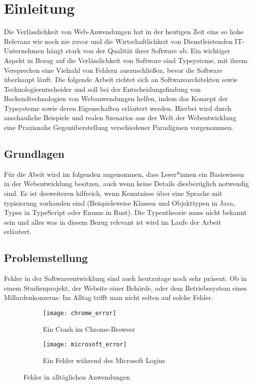\section{Einleitung} 

Die Verlässlichkeit von Web-Anwendungen hat in der heutigen Zeit eine so hohe Relevanz wie noch
nie zuvor und die Wirtschaftlichkeit von Dienstleistenden IT-Unternehmen hängt stark von der Qualität ihrer Software ab.
Ein wichtiger Aspekt in Bezug auf die Verlässlichkeit von Software sind Typsysteme, mit ihrem Versprechen eine Vielzahl
von Fehlern auszuschließen, bevor die Software überhaupt läuft.
Die folgende Arbeit richtet sich an Softwarearchitekten sowie Technologieentscheider
und soll bei der Entscheidungsfindung von Backendtechnologien von Webanwendungen helfen, 
indem das Konzept der Typsysteme sowie deren Eigenschaften erläutert werden.
Hierbei wird durch anschauliche Beispiele und realen Szenarios aus der Welt der Webentwicklung eine Praxisnahe
Gegenüberstellung verschiedener Paradigmen vorgenommen.

\subsection{Grundlagen} 

Für die Abeit wird im folgenden angenommen, dass Leser*innen ein Basiswissen in der Webentwicklung besitzen,
auch wenn keine Details diesbezüglich notwendig sind.
Es ist desweiteren hilfreich, wenn Kenntnisse über eine Sprache mit typisierung vorhanden sind
(Beispielsweise Klassen und Objekttypen in Java, Types in TypeScript oder Enums in Rust).
Die Typentheorie muss nicht bekannt sein und alles was in diesem Bezug relevant ist wird im Laufe der Arbeit erläutert.


\subsection{Problemstellung} 

Fehler in der Softwareentwicklung sind auch heutzutage noch sehr präsent. Ob in einem Studienprojekt, der Website einer Behörde,
oder dem Betriebssystem eines Millardenkonzerns: Im Alltag trifft man nicht selten auf solche Fehler.

\begin{figure}[H]
  \centering
  \begin{subfigure}[b]{0.4\linewidth}
    \texttt{[image: chrome\_error]}
    \caption{Ein Crash im Chrome-Browser}
  \end{subfigure}
  \hspace{0.5cm}
  \begin{subfigure}[b]{0.4\linewidth}
    \texttt{[image: microsoft\_error]}
    \caption{Ein Fehler während des Microsoft Logins}
  \end{subfigure}
  \caption{Fehler in alltäglichen Anwendungen}
\end{figure}

